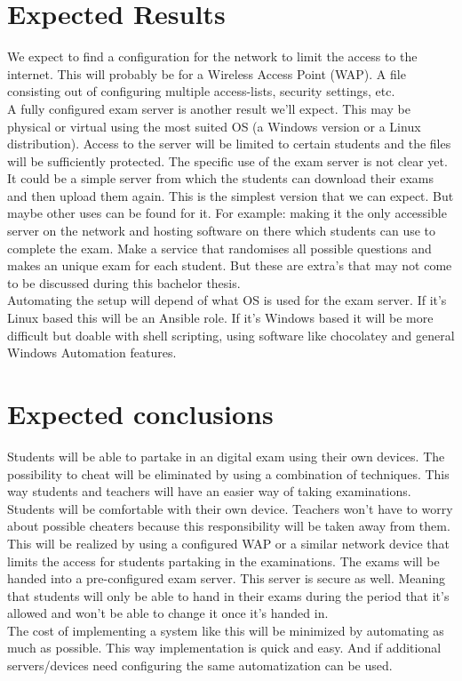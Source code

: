 \section{Expected Results}
\label{sec:verwachte_resultaten}

We expect to find a configuration for the network to limit the access to the internet. This will probably be for a Wireless Access Point (WAP). A file consisting out of configuring multiple access-lists, security settings, etc. \\
A fully configured exam server is another result we'll expect. This may be physical or virtual using the most suited OS (a Windows version or a Linux distribution). Access to the server will be limited to certain students and the files will be sufficiently protected. The specific use of the exam server is not clear yet. It could be a simple server from which the students can download their exams and then upload them again. This is the simplest version that we can expect. But maybe other uses can be found for it. For example: making it the only accessible server on the network and hosting software on there which students can use to complete the exam. Make a service that randomises all possible questions and makes an unique exam for each student. But these are extra’s that may not come to be discussed during this bachelor thesis. 
\\
Automating the setup will depend of what OS is used for the exam server. If it's Linux based this will be an Ansible role. If it's Windows based it will be more difficult but doable with shell scripting, using software like chocolatey and general Windows Automation features. \\


\section{Expected conclusions}
\label{sec:verwachte_conclusies}

Students will be able to partake in an digital exam using their own devices. The possibility to cheat will be eliminated by using a combination of techniques. This way students and teachers will have an easier way of taking examinations. Students will be comfortable with their own device. Teachers won’t have to worry about possible cheaters because this responsibility will be taken away from them. \\
This will be realized by using a configured WAP or a similar network device that limits the access for students partaking in the examinations. The exams will be handed into a pre-configured exam server. This server is secure as well.  Meaning that students will only be able to hand in their exams during the period that it’s allowed and won’t be able to change it once it’s handed in. \\
The cost of implementing a system like this will be minimized by automating as much as possible. This way implementation is quick and easy. And if additional servers/devices need configuring the same automatization can be used.\\


